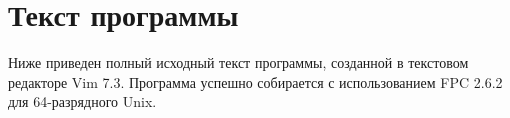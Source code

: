 \section{Текст программы}
Ниже приведен полный исходный текст программы, созданной в текстовом 
редакторе Vim 7.3. Программа успешно собирается с использованием FPC 2.6.2
для 64-разрядного Unix.\\
\\
\\
\\

\pagebreak

